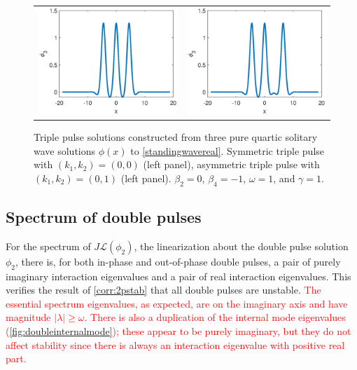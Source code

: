\documentclass[12pt]{elsarticle}
\def\calL{{\mathcal L}}
\newcommand{\revised}[1]{ \textcolor{red}{#1} }
\begin{document}
\begin{figure}[H]
\centering
\begin{tabular}{cc}
\includegraphics[width=8cm]{images/triple00} &
\includegraphics[width=8cm]{images/triple01}
\end{tabular}
\caption{Triple pulse solutions constructed from three pure quartic solitary wave solutions $\phi(x)$ to \cref{standingwavereal}. Symmetric triple pulse with $(k_1, k_2) = (0,0)$ (left panel), asymmetric triple pulse with $(k_1, k_2) = (0,1)$ (left panel). $\beta_2 = 0$, $\beta_4 = -1$, $\omega = 1$, and $\gamma = 1$. }
\label{fig:triplepulses}
\end{figure} 

\subsection{Spectrum of double pulses}

For the spectrum of $J \calL(\phi_2)$, the linearization about the double pulse solution $\phi_2$, there is, for both in-phase and out-of-phase double pulses, a pair of purely imaginary interaction eigenvalues and a pair of real interaction eigenvalues. This verifies the result of \cref{corr:2pstab} that all double pulses are unstable. \revised{The essential spectrum eigenvalues, as expected, are on the imaginary axis and have magnitude $|\lambda| \geq \omega$. There is also a duplication of the internal mode eigenvalues (\cref{fig:doubleinternalmode}); these appear to be purely imaginary, but they do not affect stability since there is always an interaction eigenvalue with positive real part.}
\end{document}
